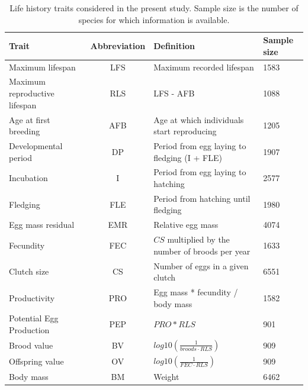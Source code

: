 \begin{table}
\caption[Life history traits]{Life history traits considered in the present
study. Sample size is the number of species for which information is
available.}\label{tab:table2.1}
\begin{tabular}{@{}p{2.5cm}cp{7.5cm}p{1.5cm}@{}}
\toprule
Trait                         & Abbreviation & Definition                                   & Sample size \\
\midrule
Maximum lifespan              & LFS          & Maximum recorded lifespan                    & 1583        \\
Maximum reproductive lifespan & RLS          & LFS - AFB                                    & 1088        \\
Age at first breeding         & AFB          & Age at which individuals start reproducing   & 1205        \\
Developmental period          & DP           & Period from egg laying to fledging (I + FLE) & 1907        \\
Incubation                    & I            & Period from egg laying to hatching           & 2577        \\
Fledging                      & FLE          & Period from hatching until fledging          & 1980        \\
Egg mass residual             & EMR          & Relative egg mass                            & 4074        \\
Fecundity                     & FEC          & $CS$ multiplied by the number of broods per year         & 1633 \\
Clutch size                   & CS           & Number of eggs in a given clutch             & 6551 \\
Productivity                  & PRO          & Egg mass * fecundity / body mass             & 1582 \\
Potential Egg Production      & PEP          & $PRO * RLS$                                  & 901 \\
Brood value                   & BV           & $log10\left(\tfrac{1}{ broods \cdot RLS } \right)$       & 909  \\
Offspring value               & OV           & $log10\left(\tfrac{1}{ FEC \cdot RLS } \right)$          & 909 \\
Body mass                     & BM           & Weight                                       & 6462        \\
\bottomrule
\end{tabular}
\end{table}

